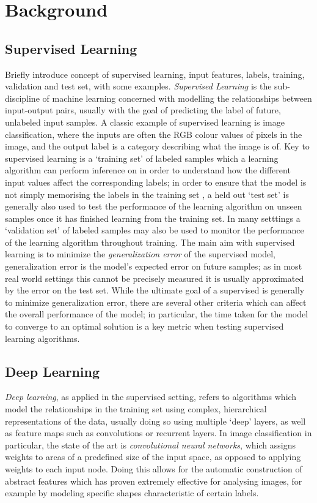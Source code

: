 \chapter{Background}

\section{Supervised Learning}
Briefly introduce concept of supervised learning, input features, labels, training, validation and test set, with some examples.
\textit{Supervised Learning} is the sub-discipline of machine learning concerned with modelling the relationships between input-output pairs, usually with the goal of predicting the label of future, unlabeled input samples. A classic example of supervised learning is image classification, where the inputs are often the RGB colour values of pixels in the image, and the output label is a category describing what the image is of. Key to supervised learning is a `training set' of labeled samples which a learning algorithm can perform inference on in order to understand how the different input values affect the corresponding labels; in order to ensure that the model is not simply memorising the labels in the training set , a held out `test set' is generally also used to test the performance of the learning algorithm on unseen samples once it has finished learning from the training set. In many setttings a `validation set' of labeled samples may also be used to monitor the performance of the learning algorithm throughout training. The main aim with supervised learning is to minimize the \textit{generalization error} of the supervised model, generalization error is the model's expected error on future samples; as in most real world settings this cannot be precisely measured it is usually approximated by the error on the test set. While the ultimate goal of a supervised is generally to minimize generalization error, there are several other criteria which can affect the overall performance of the model; in particular, the time taken for the model to converge to an optimal solution is a key metric when testing supervised learning algorithms. 

\section{Deep Learning}
\textit{Deep learning}, as applied in the supervised setting, refers to algorithms which model the relationships in the training set using complex, hierarchical representations of the data, usually doing so using multiple `deep' layers, as well as feature maps such as convolutions or recurrent layers. In image classification in particular, the state of the art is \textit{convolutional neural networks}, which assigns weights to areas of a predefined size of the input space, as opposed to applying weights to each input node. Doing this allows for the automatic construction of abstract features which has proven extremely effective for analysing images, for example by modeling specific shapes characteristic of certain labels.

